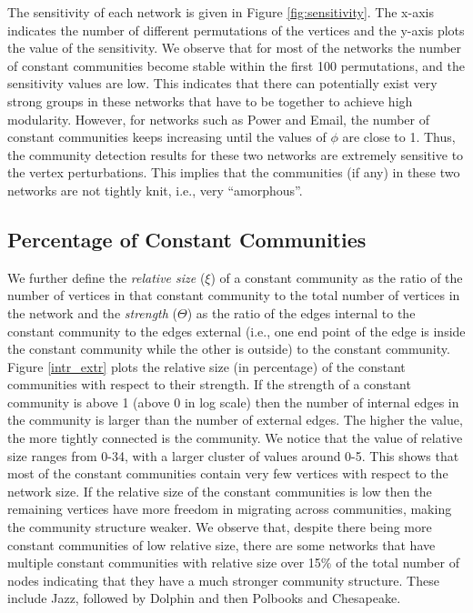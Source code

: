 The sensitivity of each network is given in Figure \ref{fig:sensitivity}. The x-axis indicates the number of
different permutations of the vertices and the y-axis plots the value of the sensitivity. We observe that for
most of the networks the number of constant communities become stable within the first 100 permutations, and the
sensitivity values are low. This indicates that there can potentially exist very strong groups in these networks
that have to be together to achieve high modularity. However, for networks such as Power and Email,
the number of constant communities keeps increasing until the values of $\phi$ are close to 1. Thus, the
community detection results for these two networks are extremely sensitive to the vertex perturbations. This
implies that the communities (if any) in these two networks are not tightly knit, i.e., very ``amorphous''.





\subsection{Percentage of Constant Communities} We further define
the
\textit{relative size} ($\xi$) of a constant community as the ratio of the number of vertices in that constant community to the total
number
of vertices in
the network and the \textit{strength} ($\Theta$) as the ratio of the edges internal to the constant community to the edges external (i.e.,
one end point of the edge is inside the constant community while the other is outside) to the
constant community. Figure \ref{intr_extr} plots the relative size (in percentage) of the constant communities with respect to their
strength. If the strength of a constant community is above 1 (above 0 in log scale) then the number of internal
edges in the community is larger than the number of external edges. The higher the value, the more tightly
connected is the community. We notice that the value of relative size ranges from 0-34, with a larger cluster of
values around 0-5. This shows that most of the constant communities contain very few vertices with respect to
the network size. If the relative size of the constant communities is low then the remaining vertices have more
freedom in migrating across communities, making the community structure weaker. We observe that, despite there
being more constant communities of low relative size, there are some networks that have multiple constant
communities with relative size over 15\% of the total number of nodes indicating that they have a much stronger
community structure. These include Jazz, followed by Dolphin and then Polbooks and Chesapeake.

